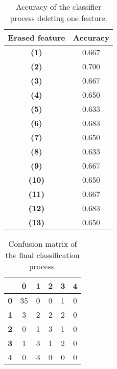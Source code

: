 \begin{table}[hbtp]
    \centering
    \begin{tabular}{c c}
        \toprule
        \textbf{Erased feature} & \textbf{Accuracy} \\ \midrule
        \textbf{(1)} & 0.667 \\
        \textbf{(2)} & 0.700 \\
        \textbf{(3)} & 0.667 \\
        \textbf{(4)} & 0.650 \\
        \textbf{(5)} & 0.633 \\
        \textbf{(6)} & 0.683 \\
        \textbf{(7)} & 0.650 \\
        \textbf{(8)} & 0.633 \\
        \textbf{(9)} & 0.667 \\
        \textbf{(10)} & 0.650 \\
        \textbf{(11)} & 0.667 \\
        \textbf{(12)} & 0.683 \\
        \textbf{(13)} & 0.650 \\
        \bottomrule
    \end{tabular}
    \caption{Accuracy of the classifier process deleting one feature.}
    \label{tab:fourth_exp}
\end{table}


\begin{table}[hbtp]
    \centering
    \begin{tabular}{c c c c c c}
        \toprule
         & \textbf{0} & \textbf{1} & \textbf{2} & \textbf{3} & \textbf{4} \\ \midrule
        \textbf{0} &  35 & 0 & 0 & 1 & 0 \\
        \textbf{1} &  3 & 2 & 2 & 2 & 0 \\
        \textbf{2} &  0 & 1 & 3 & 1 & 0 \\
        \textbf{3} &  1 & 3 & 1 & 2 & 0 \\
        \textbf{4} &  0 & 3 & 0 & 0 & 0 \\
        \bottomrule
    \end{tabular}
    \caption{Confusion matrix of the final classification process.}
    \label{tab:fourth_exp_cm}
\end{table}